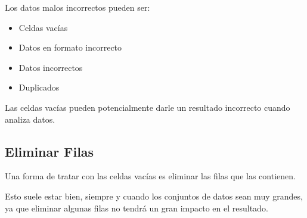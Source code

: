 Los datos malos incorrectos pueden ser:

\begin{itemize}
  \item Celdas vacías
  \item Datos en formato incorrecto
  \item Datos incorrectos
  \item Duplicados
\end{itemize}

Las celdas vacías pueden potencialmente darle un resultado incorrecto
cuando analiza datos.

\subsection{Eliminar Filas}

Una forma de tratar con las celdas vacías es eliminar las filas que las
contienen.

Esto suele estar bien, siempre y cuando los conjuntos de datos sean muy
grandes, ya que eliminar algunas filas no tendrá un gran impacto en el
resultado.\\

